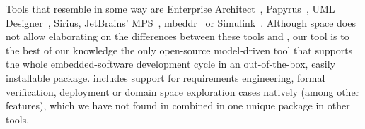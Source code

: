 Tools that resemble \af in some way are Enterprise
Architect~\cite{SparxSystems}, Papyrus~\cite{Papyrus}, UML Designer~\cite{UMLDesigner}, Sirius\cite{Sirius}, JetBrains' MPS~\cite{MPS},
mbeddr~\cite{mbeddr} or Simulink~\cite{simulink}. Although space does not allow elaborating on the
differences between these tools and \af, our tool is to the best of our knowledge the
only open-source model-driven tool that supports the whole embedded-software development
cycle in an out-of-the-box, easily installable package. \af includes support
for requirements engineering, formal verification, deployment or domain space
exploration cases natively (among other features), which we have not found in
combined in one unique package in other tools. 